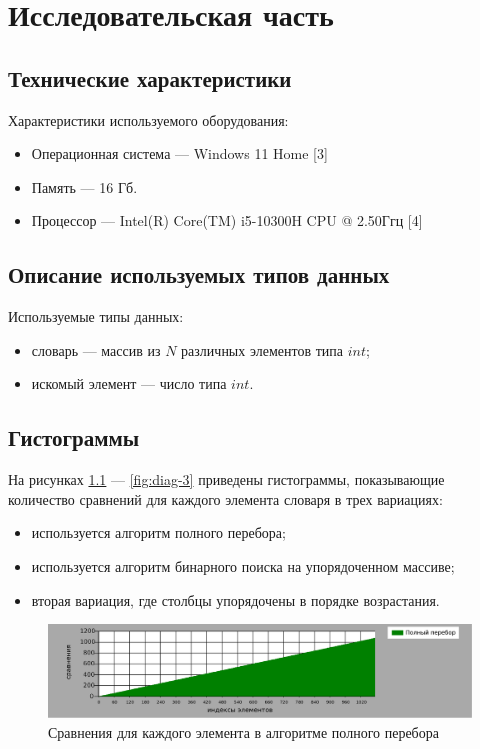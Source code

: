 \chapter{Исследовательская часть}

\section{Технические характеристики}
Характеристики используемого оборудования:
\begin{itemize}
    \item Операционная система --- Windows 11 Home [3]
    \item Память --- 16 Гб.
    \item Процессор --- Intel(R) Core(TM) i5-10300H CPU @ 2.50Ггц [4]
\end{itemize}

\section{Описание используемых типов данных}
Используемые типы данных:
\begin{itemize}
	\item словарь --- массив из $N$ различных элементов типа $int$;
	\item искомый элемент --- число типа $int$.
\end{itemize}

\section{Гистограммы}

На рисунках \ref{fig:diag-1} --- \ref{fig:diag-3} приведены гистограммы, показывающие количество сравнений для каждого элемента словаря в трех вариациях:
\begin{itemize}
    \item используется алгоритм полного перебора;
    \item используется алгоритм бинарного поиска на упорядоченном массиве;
    \item вторая вариация, где столбцы упорядочены в порядке возрастания.
\end{itemize}

\begin{figure}
    \centering
    \includegraphics[width=1\linewidth]{img/chart1.eps}
    \caption{Сравнения для каждого элемента в алгоритме полного перебора}
    \label{fig:diag-1}
\end{figure}

